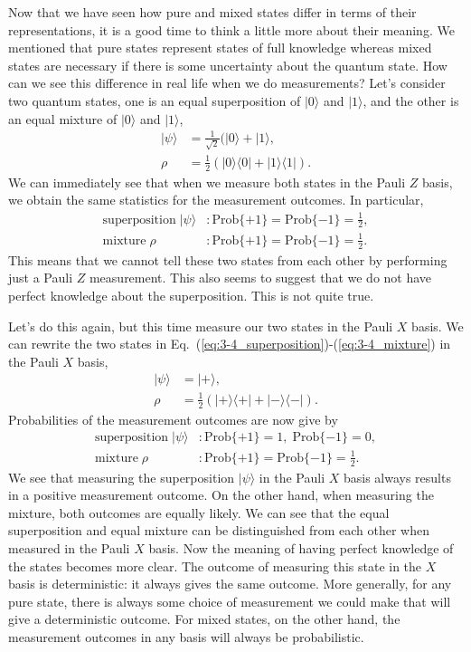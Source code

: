Now that we have seen how pure and mixed states differ in terms of their representations, it is a good time to think a little more about their meaning.
We mentioned that pure states represent states of full knowledge whereas mixed states are necessary if there is some uncertainty about the quantum state.
How can we see this difference in real life when we do measurements?
Let's consider two quantum states, one is an equal superposition of $|0\rangle$ and $|1\rangle$, and the other is an equal mixture of $|0\rangle$ and $|1\rangle$,
\begin{align}
    |\psi\rangle & = \frac{1}{\sqrt{2}} (|0\rangle + |1\rangle, \label{eq:3-4_superposition}\\
    \rho & = \frac{1}{2} (|0\rangle\langle0| + |1\rangle\langle1|). \label{eq:3-4_mixture}
\end{align}
We can immediately see that when we measure both states in the Pauli $Z$ basis, we obtain the same statistics for the measurement outcomes.
In particular,
\begin{align}
    \text{superposition} \; |\psi\rangle & : \text{Prob}\{+1\} = \text{Prob}\{-1\} = \frac{1}{2},  \\
    \text{mixture} \; \rho & : \text{Prob}\{+1\} = \text{Prob}\{-1\} = \frac{1}{2}.
\end{align}
This means that we cannot tell these two states from each other by performing just a Pauli $Z$ measurement.
This also seems to suggest that we do not have perfect knowledge about the superposition. This is not quite true.

Let's do this again, but this time measure our two states in the Pauli $X$ basis.
We can rewrite the two states in Eq.~(\ref{eq:3-4_superposition})-(\ref{eq:3-4_mixture}) in the Pauli $X$ basis,
\begin{align}
    |\psi\rangle & = |+\rangle, \\
    \rho & = \frac{1}{2} (|+\rangle\langle+| + |-\rangle\langle-|).
\end{align}
Probabilities of the measurement outcomes are now give by
\begin{align}
    \text{superposition} \; |\psi\rangle & : \text{Prob}\{+1\} = 1, \; \text{Prob}\{-1\} = 0,  \\
    \text{mixture} \; \rho & : \text{Prob}\{+1\} = \text{Prob}\{-1\} = \frac{1}{2}.
\end{align}
We see that measuring the superposition $|\psi\rangle$ in the Pauli $X$ basis always results in a positive measurement outcome.
On the other hand, when measuring the mixture, both outcomes are equally likely.
We can see that the equal superposition and equal mixture can be distinguished from each other when measured in the Pauli $X$ basis.
Now the meaning of having perfect knowledge of the states becomes more clear.
The outcome of measuring this state in the $X$ basis is deterministic: it always gives the same outcome. More generally, for any pure state, there is always some choice of measurement we could make that will give a deterministic outcome. For mixed states, on the other hand, the measurement outcomes in any basis will always be probabilistic.

